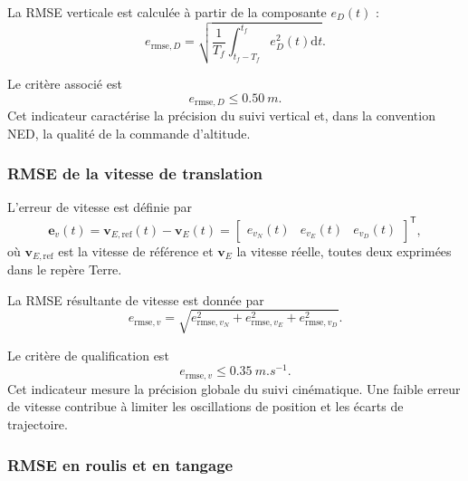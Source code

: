 \documentclass[11pt,a4paper,oneside]{report}
\newcommand{\vect}[1]{\bm{#1}}
\newcommand{\trans}{^{\mathsf T}}
\newcommand{\dd}{\mathrm{d}}
\begin{document}
La RMSE verticale est calculée à partir de la composante $e_D(t)$ :
\begin{equation}
	e_{\mathrm{rmse},D}
	=
	\sqrt{
		\frac{1}{T_f}
		\int_{t_f-T_f}^{t_f}
		e_D^2(t)\dd t
	}.
	\label{eq_qualification_vertical_rmse}
\end{equation}

Le critère associé est
\begin{equation}
	e_{\mathrm{rmse},D}\leq\SI{0.50}{m}.
	\label{eq_vertical_rmse_requirement}
\end{equation}
Cet indicateur caractérise la précision du suivi vertical et, dans la convention NED, la qualité de la commande d'altitude.

\subsubsection{RMSE de la vitesse de translation}

L'erreur de vitesse est définie par
\begin{equation}
	\vect e_v(t)
	=
	\vect v_{E,\mathrm{ref}}(t)-\vect v_E(t)
	=
	\begin{bmatrix}
		e_{v_N}(t) & e_{v_E}(t) & e_{v_D}(t)
	\end{bmatrix}\trans,
	\label{eq_velocity_tracking_error}
\end{equation}
où $\vect v_{E,\mathrm{ref}}$ est la vitesse de référence et $\vect v_E$ la vitesse réelle, toutes deux exprimées dans le repère Terre.

La RMSE résultante de vitesse est donnée par
\begin{equation}
	e_{\mathrm{rmse},v}
	=
	\sqrt{
		e_{\mathrm{rmse},v_N}^{2}
		+
		e_{\mathrm{rmse},v_E}^{2}
		+
		e_{\mathrm{rmse},v_D}^{2}
	}.
	\label{eq_velocity_resultant_rmse}
\end{equation}

Le critère de qualification est
\begin{equation}
	e_{\mathrm{rmse},v}
	\leq
	\SI{0.35}{m.s^{-1}}.
	\label{eq_velocity_rmse_requirement}
\end{equation}
Cet indicateur mesure la précision globale du suivi cinématique. Une faible erreur de vitesse contribue à limiter les oscillations de position et les écarts de trajectoire.

\subsubsection{RMSE en roulis et en tangage}
\end{document}
